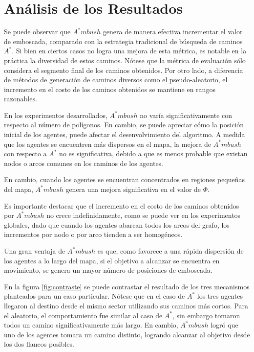 \documentclass{egpubl}
\begin{document}
\section{Análisis de los Resultados}

Se puede observar que $A^*mbush$ genera de manera
efectiva incrementar el valor de emboscada, comparado
con la estrategia tradicional de búsqueda de caminos
$A^*$. Si bien en ciertos casos no logra una mejora
de esta métrica, es notable en la práctica la diversidad
de estos caminos. Nótese que la métrica de evaluación
sólo considera el segmento final de los caminos obtenidos.
Por otro lado, a diferencia de métodos de generación
de caminos diversos como el pseudo-aleatorio, el incremento
en el costo de los caminos obtenidos se mantiene en rangos
razonables.

En los experimentos desarrollados, $A^*mbush$ no varía
significativamente con respecto al número de polígonos.
En cambio, se puede apreciar cómo la posición inicial de
los agentes, puede afectar el desenvolvimiento del algoritmo.
A medida que los agentes se encuentren más dispersos en el
mapa, la mejora de $A^*mbush$ con respecto a $A^*$ no
es significativa, debido a que es menos probable que
existan nodos o arcos comunes en los caminos de los agentes.

En cambio, cuando los agentes se encuentran concentrados
en regiones pequeñas del mapa, $A^*mbush$ genera una mejora
significativa en el valor de $\Phi$.

Es importante destacar que el incremento en el costo de
los caminos obtenidos por $A^*mbush$ no crece indefinidamente,
como se puede ver en los experimentos globales,
dado que cuando los agentes abarcan todos los arcos del grafo,
los incrementos por nodo o por arco tienden a ser homogéneos.

Una gran ventaja de $A^*mbush$ es que, como favorece a una
rápida dispersión de los agentes a lo largo del mapa, si
el objetivo a alcanzar se encuentra en movimiento, se genera
un mayor número de posiciones de emboscada.

En la figura \ref{fig:contraste} se puede contrastar el resultado
de los tres mecanismos planteados para un caso particular.
Nótese que en el caso de $A^*$ los tres agentes llegaron al destino
desde el mismo sector utilizando sus caminos más cortos. Para el
aleatorio, el comportamiento fue similar al caso de $A^*$, sin
embargo tomaron todos un camino significativamente más largo.
En cambio, $A^*mbush$ logró que uno de los agentes tomara
un camino distinto, logrando alcanzar al objetivo desde los
dos flancos posibles.
\end{document}
